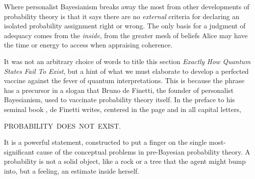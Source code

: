 \documentclass[aps,pra,superscriptaddress,12pt,tightenlines,nofootinbib]{revtex4-2}
\begin{document}
Where personalist Bayesianism breaks away the most from other developments of probability theory is that it says there are no {\it external\/} criteria for declaring an isolated probability assignment right or wrong.  The only basis for a judgment of adequacy comes from the {\it inside}, from the greater mesh of beliefs Alice may have the time or energy to access when appraising coherence.

It was not an arbitrary choice of words to title this section {\it
  Exactly How Quantum States Fail To Exist}, but a hint of what we must
elaborate to develop a perfected vaccine against the fever of quantum
interpretations.  This is because the phrase has a precursor in a
slogan that Bruno de Finetti, the founder of personalist Bayesianism, used
to vaccinate probability theory itself.  In the preface to his seminal
book \cite{DeFinetti90}, de Finetti writes, centered in the page and
in all capital letters,
\begin{center}
PROBABILITY$\,$ DOES$\,$ NOT$\,$ EXIST.
\end{center}
It is a powerful statement, constructed to put a finger on the single most-significant cause of the conceptual problems in pre-Bayesian probability theory.  A probability is not a solid object, like a rock or a tree that the agent might bump into, but a feeling, an estimate inside herself.
\end{document}
